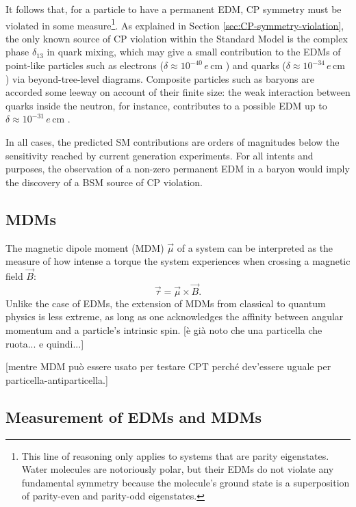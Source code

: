 It follows that, for a particle to have a permanent EDM, CP symmetry must be violated in some measure\footnote{This line of reasoning only applies to systems that are parity eigenstates. Water molecules are notoriously polar, but their EDMs do not violate any fundamental symmetry because the molecule's ground state is a superposition of parity-even and parity-odd eigenstates.}.
As explained in Section \ref{sec:CP-symmetry-violation}, the only known source of CP violation within the Standard Model is the complex phase $\delta_{13}$ in quark mixing, which may give a small contribution to the EDMs of point-like particles such as electrons ($\delta \approx {10}^{-40}\,e\,\text{cm}$ \cite{electronEDM}) and quarks ($\delta \approx {10}^{-34} \,e\,\text{cm}$ \cite{quarkEDM}) via beyond-tree-level diagrams. Composite particles such as baryons are accorded some leeway on account of their finite size:
the weak interaction between quarks inside the neutron, for instance, contributes to a possible EDM up to $\delta \approx {10}^{-31}\,e\,\text{cm}$ \cite{neutronEDM}.

In all cases, the predicted SM contributions are orders of magnitudes below the sensitivity reached by current generation experiments.
For all intents and purposes, the observation of a non-zero permanent EDM in a baryon would imply the discovery of a BSM source of CP violation.

\subsection{MDMs}
The magnetic dipole moment (MDM) $\vec{\mu}$ of a system can be interpreted as the measure of how intense a torque the system experiences when crossing a magnetic field $\vec{B}$:
\begin{equation}
\vec{\tau} = \vec{\mu} \times \vec{B}.
\end{equation}
Unlike the case of EDMs, the extension of MDMs from classical to quantum physics is less extreme, as long as one acknowledges the affinity between angular momentum and a particle's intrinsic spin. [è già noto che una particella che ruota... e quindi...]

[mentre MDM può essere usato per testare CPT perché dev'essere uguale per particella-antiparticella.]

\subsection{Measurement of EDMs and MDMs}

